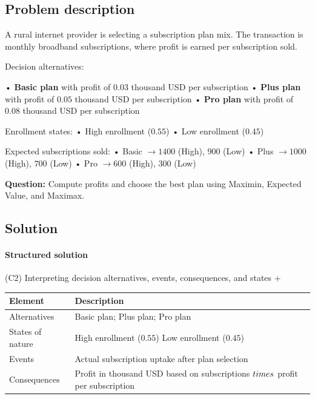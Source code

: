 \documentclass[11pt]{article}
\begin{document}
	
	\subsection*{Problem description}
	
	\hypertarget{problem5-problem}{}
	
	A rural internet provider is selecting a subscription plan mix. The transaction is monthly broadband subscriptions,
	where profit is earned per subscription sold.
	
	
	
	
	
	
	Decision alternatives:
	
	
	
	
	
	
	• \textbf{Basic plan} with profit of $0.03$ thousand USD per subscription
	• \textbf{Plus plan} with profit of $0.05$ thousand USD per subscription
	• \textbf{Pro plan} with profit of $0.08$ thousand USD per subscription
	
	
	
	
	
	
	Enrollment states:
	• High enrollment ($0.55$)
	• Low enrollment ($0.45$)
	
	
	
	
	
	
	Expected subscriptions sold:
	• Basic $\to 1400$ (High), $900$ (Low)
	• Plus $\to 1000$ (High), $700$ (Low)
	• Pro $\to 600$ (High), $300$ (Low)
	
	
	
	
	
	\textbf{Question:} Compute profits and choose the best plan using Maximin, Expected Value, and Maximax.
	
	\subsection*{Solution}
	
	\hypertarget{problem5-solution}{}
	
	\paragraph{Structured solution}
	
	
	(C2) Interpreting decision alternatives, events, consequences, and states
	+
	
	
	\begin{center}
		\begin{tabular}{ll}
			\toprule
			Element & Description \\
			\midrule
			Alternatives & Basic plan; Plus plan; Pro plan \\
			States of nature & High enrollment
			($0.55$)
			Low enrollment
			($0.45$) \\
			Events & Actual subscription uptake after plan selection \\
			Consequences & Profit in thousand USD based on subscriptions $\\times$ profit per subscription \\
			\bottomrule
		\end{tabular}
	\end{center}
	
\end{document}
